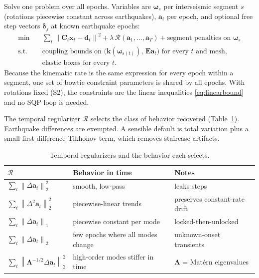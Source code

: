 \documentclass[11pt]{article}
\newcommand{\vect}[1]{\bm{#1}}
\newcommand{\mat}[1]{\mathbf{#1}}
\newcommand{\norm}[1]{\left\lVert #1 \right\rVert}
\begin{document}
Solve one problem over all epochs. Variables are $\vect{\omega}_s$ per interseismic segment $s$ (rotations piecewise constant across earthquakes), $\vect{a}_t$ per epoch, and optional free step vectors $\vect{\delta}_j$ at known earthquake epochs:
\begin{equation}
\begin{aligned}
\min \quad & \sum_t \norm{\mat{C}_t\vect{x}_t - \vect{d}_t}^2 + \lambda\,\mathcal{R}(\vect{a}_1,\dots,\vect{a}_T) + \text{segment penalties on } \vect{\omega}_s \\
\text{s.t.} \quad & \text{coupling bounds on } \bigl(\vect{k}(\vect{\omega}_{s(t)}),\, \mat{E}\vect{a}_t\bigr) \text{ for every } t \text{ and mesh}, \\
& \text{elastic boxes for every } t.
\end{aligned}
\end{equation}
Because the kinematic rate is the same expression for every epoch within a segment, one set of bowtie constraint parameters is shared by all epochs. With rotations fixed (S2), the constraints are the linear inequalities \eqref{eq:linearbound} and no SQP loop is needed.

The temporal regularizer $\mathcal{R}$ selects the class of behavior recovered (Table~\ref{tab:regularizers}). Earthquake differences are exempted. A sensible default is total variation plus a small first-difference Tikhonov term, which removes staircase artifacts.

\begin{table}[h]
\centering
\small
\begin{tabular}{@{}lll@{}}
\toprule
$\mathcal{R}$ & Behavior in time & Notes \\
\midrule
$\sum_t \norm{\Delta\vect{a}_t}_2^2$ & smooth, low-pass & leaks steps \\
$\sum_t \norm{\Delta^2\vect{a}_t}_2^2$ & piecewise-linear trends & preserves constant-rate drift \\
$\sum_t \norm{\Delta\vect{a}_t}_1$ & piecewise constant per mode & locked-then-unlocked \\
$\sum_t \norm{\Delta\vect{a}_t}_2$ & few epochs where all modes change & unknown-onset transients \\
$\sum_t \norm{\mat{\Lambda}^{-1/2}\Delta\vect{a}_t}_2^2$ & high-order modes stiffer in time & $\mat{\Lambda}$ = Mat\'ern eigenvalues \\
\bottomrule
\end{tabular}
\caption{Temporal regularizers and the behavior each selects.}
\label{tab:regularizers}
\end{table}
\end{document}
